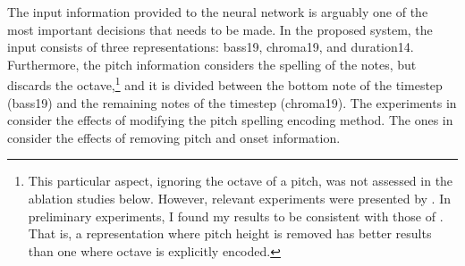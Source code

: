 
The input information provided to the neural network is
arguably one of the most important decisions that needs to
be made. In the proposed system, the input consists of three
representations: \gls{bass19}, \gls{chroma19}, and
\gls{duration14}. Furthermore, the pitch information
considers the spelling of the notes, but discards the
octave,\footnote{This particular aspect, ignoring the octave
of a pitch, was not assessed in the ablation studies below.
However, relevant experiments were presented by
\textcite{micchi2020not}. In preliminary experiments, I
found my results to be consistent with those of
\textcite{micchi2020not}. That is, a representation where
pitch height is removed has better results than one where
octave is explicitly encoded.} and it is divided between the
bottom note of the timestep (\gls{bass19}) and the remaining
notes of the timestep (\gls{chroma19}). The experiments in
 consider the
effects of modifying the pitch spelling encoding method. The
ones in  consider the effects
of removing pitch and onset information.
